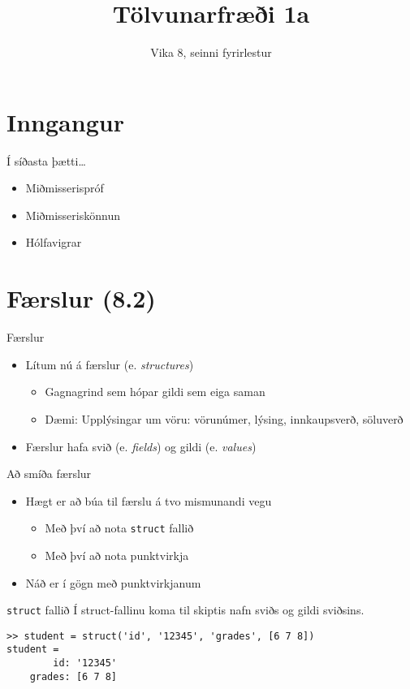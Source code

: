 \documentclass[handout]{beamer}
\title{Tölvunarfræði 1a}
\subtitle{Vika 8, seinni fyrirlestur}
\begin{document}
\begin{frame}
\titlepage
\end{frame}

\section{Inngangur}

\begin{frame}{Í síðasta þætti\ldots}
\begin{itemize}
 \item Miðmisserispróf
 \item Miðmisseriskönnun
 \item Hólfavigrar
\end{itemize}
\end{frame}

\section{Færslur (8.2)}

\begin{frame}{Færslur}
\begin{itemize}
 \item Lítum nú á færslur (e. \emph{structures})
 \begin{itemize}
  \item Gagnagrind sem hópar gildi sem eiga saman
  \item Dæmi: Upplýsingar um vöru: vörunúmer, lýsing, innkaupsverð, söluverð
 \end{itemize}
 \item Færslur hafa svið (e. \emph{fields}) og gildi (e. \emph{values})
\end{itemize}
\end{frame}

\begin{frame}{Að smíða færslur}
\begin{itemize}
 \item Hægt er að búa til færslu á tvo mismunandi vegu
 \begin{itemize}
  \item Með því að nota \texttt{struct} fallið
  \item Með því að nota punktvirkja
 \end{itemize}
 \item Náð er í gögn með punktvirkjanum
\end{itemize}
\end{frame}

\begin{frame}[fragile]{\texttt{struct} fallið}
Í struct-fallinu koma til skiptis nafn sviðs og gildi sviðsins.
\begin{verbatim}
>> student = struct('id', '12345', 'grades', [6 7 8])
student = 
        id: '12345'
    grades: [6 7 8]
\end{verbatim}
\end{frame}
\end{document}
